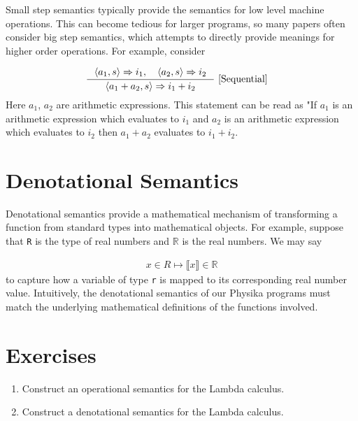 \documentclass[book.tex]{subfiles}
\begin{document}
Small step semantics typically provide the semantics for low level machine operations. This can become tedious for larger programs, so many papers often consider big step semantics, which attempts to directly provide meanings for higher order operations. For example, consider

\begin{alignat*}{2}
    &\inference[]
    {
     \langle a_1, s \rangle \Rightarrow i_1, \quad \langle a_2, s \rangle \Rightarrow i_2
    }
    {
    \langle a_1 + a_2, s \rangle \Rightarrow i_1 + i_2 
    } \ \textrm{[Sequential]} 
\end{alignat*}
Here $a_1$, $a_2$ are arithmetic expressions. This statement can be read as "If $a_1$ is an arithmetic expression which evaluates to $i_1$ and $a_2$ is an arithmetic expression which evaluates to $i_2$ then $a_1 + a_2$ evaluates to $i_1 + i_2$.


\section{Denotational Semantics}

Denotational semantics provide a mathematical mechanism of transforming a function from standard types into mathematical objects. For example, suppose that \lstinline{R} is the type of real numbers and $\mathbb{R}$ is the real numbers. We may say

\begin{align}
    x \in R \mapsto \llbracket x \rrbracket \in \mathbb{R}
\end{align}
to capture how a variable of type \lstinline{r} is mapped to its corresponding real number value. Intuitively, the denotational semantics of our Physika programs must match the underlying mathematical definitions of the functions involved.




\section{Exercises}

\begin{enumerate}
    \item Construct an operational semantics for the Lambda calculus.
    \item Construct a denotational semantics for the Lambda calculus.
\end{enumerate}
\end{document}
